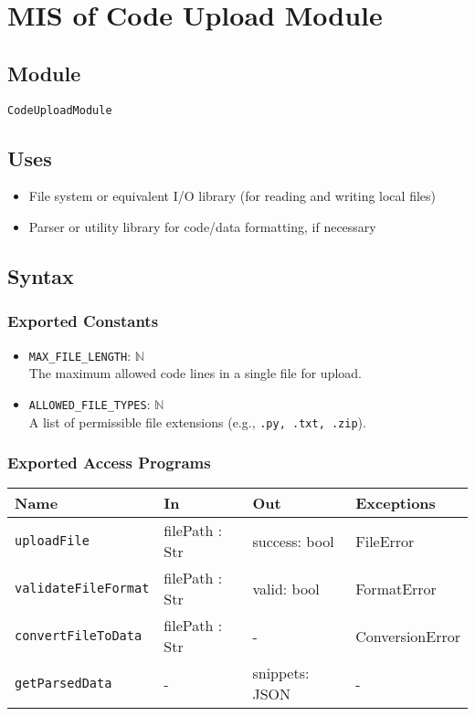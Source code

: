 \documentclass[12pt, titlepage]{article}
\begin{document}
\section{MIS of Code Upload Module} \label{mCodeUpload}

\subsection{Module} %

\texttt{CodeUploadModule} 

\subsection{Uses}

\begin{itemize}
    \item File system or equivalent I/O library (for reading and writing local files)
    \item Parser or utility library for code/data formatting, if necessary
\end{itemize}

\subsection{Syntax}

\subsubsection{Exported Constants}

\begin{itemize}
    \item \texttt{MAX\_FILE\_LENGTH}: $\mathbb{N}$ \\ 
    The maximum allowed code lines in a single file for upload.
    \item \texttt{ALLOWED\_FILE\_TYPES}: $\mathbb{N}$ \\ 
    A list of permissible file extensions (e.g., \texttt{.py, .txt, .zip}).
\end{itemize}

\subsubsection{Exported Access Programs}

\begin{center}
\begin{tabular}{p{5cm} p{3.5cm} p{3.5cm} p{2cm}}
\hline
\textbf{Name} & \textbf{In} & \textbf{Out} & \textbf{Exceptions} \\
\hline
\texttt{uploadFile} & filePath : Str & success: bool & FileError \\
\texttt{validateFileFormat} & filePath : Str & valid: bool & FormatError \\
\texttt{convertFileToData} & filePath : Str & - & ConversionError \\
\texttt{getParsedData} & - & snippets: JSON & -\\
\hline
\end{tabular}
\end{center}
\end{document}
